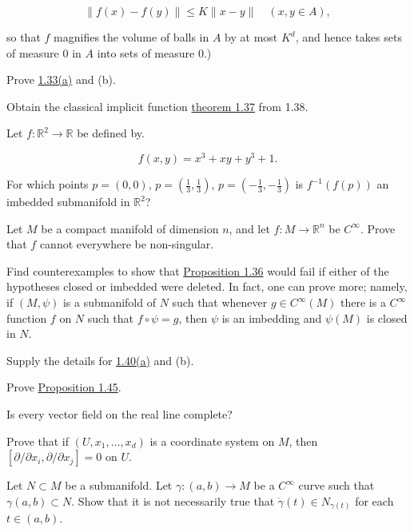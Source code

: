 \begin{problemset}
	\[
		\|f(x)-f(y)\|\leq K\|x-y\|\quad(x,y\in A),
	\]

	so that $f$ magnifies the volume of balls in $A$ by at most $K^{d}$, and hence takes sets of measure 0 in $A$ into sets of measure 0.)

	\item Prove \hyperref[thm:1.33]{1.33(a)} and (b).

	\item Obtain the classical implicit function \hyperref[thm:1.37]{theorem 1.37} from 1.38.

	\item Let  $ f\colon \mathbb{R}^2 \to \mathbb{R} $ be defined by.

	\[
		f(x,y)=x^{3}+x y+y^{3}+1.
	\]

	For which points $p = (0,0)$, $p = (\tfrac{1}{3},\tfrac{1}{3})$, $p = (-\tfrac{1}{3},-\tfrac{1}{3})$ is $f^{-1}(f(p))$ an imbedded submanifold in $\mathbb{R}^2$?

	\item Let $M$ be a compact manifold of dimension $n$, and let $f: M \to \mathbb{R}^n$ be $C^\infty$. Prove that $f$ cannot everywhere be non-singular.

	\item Find counterexamples to show that \hyperref[thm:1.36]{Proposition 1.36} would fail if either of the hypotheses closed or imbedded were deleted. In fact, one can prove more; namely, if $(M,\psi)$ is a submanifold of $N$ such that whenever $g\in C^\infty(M)$ there is a $C^\infty$ function $f$ on $N$ such that $f\circ\psi=g$, then $\psi$ is an imbedding and $\psi(M)$ is closed in $N$.

	\item Supply the details for \hyperref[thm:1.40]{1.40(a)} and (b).

	\item Prove \hyperref[thm:1.45]{Proposition 1.45}.

	\item Is every vector field on the real line complete?

	\item Prove that if $(U, x_1, \ldots, x_d)$ is a coordinate system on $M$, then $[\partial/\partial x_i, \partial/\partial x_j] = 0$ on $U$.

	\item Let $N \subset M$ be a submanifold. Let $\gamma: (a,b) \to M$ be a $C^\infty$ curve such that $\gamma(a,b) \subset N$. Show that it is not necessarily true that $\dot{\gamma}(t) \in N_{\gamma(t)}$ for each $t \in (a,b)$.


\end{problemset}
